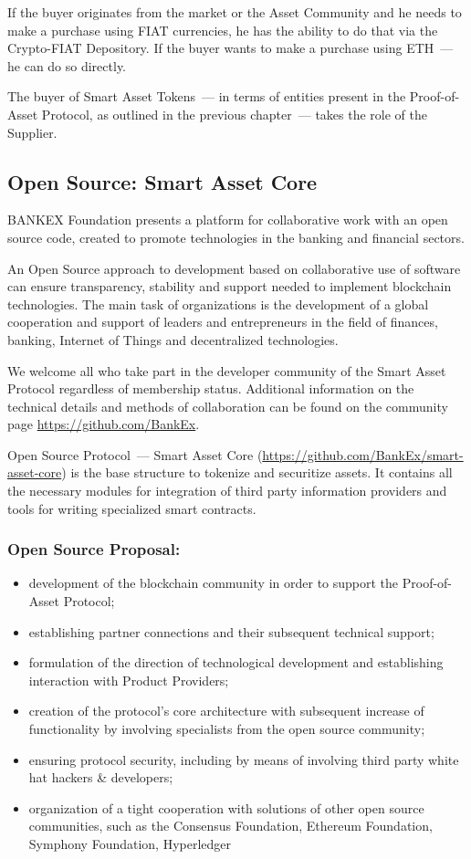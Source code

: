 \documentclass{article}
\begin{document}
\begin{multicols}{2}
If the buyer originates from the market or the Asset Community and he needs to make a purchase using FIAT currencies, he has the ability to do that via the Crypto-FIAT Depository. If the buyer wants to make a purchase using ETH~--- he can do so directly.
	
The buyer of Smart Asset Tokens~--- in terms of entities present in the Proof-of-Asset Protocol, as outlined in the previous chapter~--- takes the role of the Supplier.

\subsection{Open Source: Smart Asset Core}

BANKEX Foundation presents a platform for collaborative work with an open source code, created to promote technologies in the banking and financial sectors.

An Open Source approach to development based on collaborative use of software can ensure transparency, stability and support needed to implement blockchain technologies. The main task of organizations is the development of a global cooperation and support of leaders and entrepreneurs in the field of finances, banking, Internet of Things and decentralized technologies. 

We welcome all who take part in the developer community of the Smart Asset Protocol regardless of membership status. Additional information on the technical details and methods of collaboration can be found on the community page \url{https://github.com/BankEx}.

Open Source Protocol~--- Smart Asset Core (\url{https://github.com/BankEx/smart-asset-core}) is the base structure to tokenize and securitize assets. It contains all the necessary modules for integration of third party information providers and tools for writing specialized smart contracts.
	
\subsubsection*{Open Source Proposal:}

\begin{itemize}
\item development of the blockchain community in order to support the Proof-of-Asset Protocol;
\item establishing partner connections and their subsequent technical support;
\item formulation of the direction of technological development and establishing interaction with Product Providers;
\item creation of the protocol’s core architecture with subsequent increase of functionality by involving specialists from the open source community;
\item ensuring protocol security, including by means of involving third party white hat hackers \& developers;
\item organization of a tight cooperation with solutions of other open source communities, such as the Consensus Foundation, Ethereum Foundation, Symphony Foundation, Hyperledger
\end{itemize}
	

\end{multicols}
\end{document}
